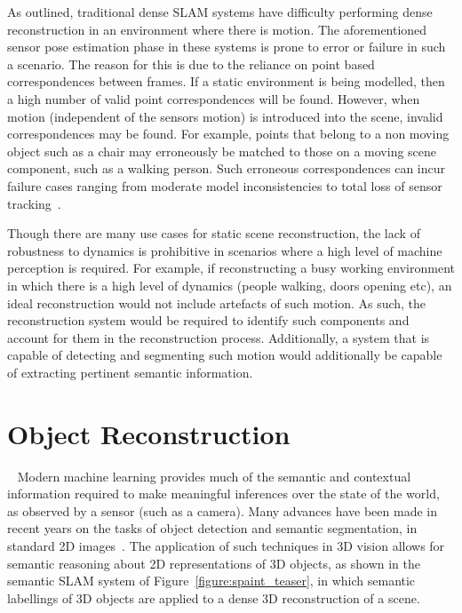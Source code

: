 As outlined, traditional dense SLAM systems have difficulty performing dense reconstruction in an 
environment where there is motion. The aforementioned sensor pose estimation phase in these systems
is prone to error or failure in such a scenario. The reason for this is due to the reliance on point based 
correspondences between frames. If a static environment is being modelled, then a high number of valid point 
correspondences will be found. However, when motion (independent of the sensors motion) is introduced into 
the scene, invalid correspondences may be found. For example, points that belong to a non moving object 
such as a chair may erroneously be matched to those on a moving scene component, such as a walking person.
Such erroneous correspondences can incur failure cases ranging from moderate model inconsistencies to total 
loss of sensor tracking~\cite{Newcombe2015}.

Though there are many use cases for static scene reconstruction, the lack of robustness to dynamics is 
prohibitive in scenarios where a high level of machine perception is required. For example, if 
reconstructing a busy working environment in which there is a high level of dynamics (people walking, 
doors opening etc), an ideal reconstruction would not include artefacts of such motion. As such, the 
reconstruction system would be required to identify such components and account for them in the 
reconstruction process. Additionally, a system that is capable of detecting and segmenting such motion 
would additionally be capable of extracting pertinent semantic information.

\section{Object Reconstruction}
~\label{sec:intro_object_recon}
Modern machine learning provides much of the semantic and contextual information required to make meaningful 
inferences over the state of the world, as observed by a sensor (such as a camera). Many advances 
have been made in recent years on the tasks of object detection and semantic segmentation, in standard 2D 
images~\cite{Girshick2014,Shelhamer2017,Civera2011}. The application of such techniques in 3D vision allows 
for semantic reasoning about 2D representations of 3D objects, as shown in the semantic SLAM system of 
Figure~\ref{figure:spaint_teaser}, in which semantic labellings of 3D objects are applied to a 
dense 3D reconstruction of a scene.

